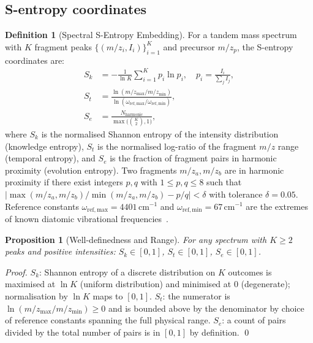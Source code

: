 \documentclass[twocolumn,10pt,a4paper]{article}
\theoremstyle{thmstyle}
\newtheorem{proposition}[theorem]{Proposition}
\theoremstyle{definition}
\newtheorem{definition}[theorem]{Definition}
\theoremstyle{remark}
\newcommand{\Sk}{S_{k}}
\newcommand{\St}{S_{t}}
\newcommand{\Se}{S_{e}}
\begin{document}
\subsection{S-entropy coordinates}

\begin{definition}[Spectral S-Entropy Embedding]
\label{def:sentropy}
For a tandem mass spectrum with $K$ fragment peaks
$\{(m/z_i, I_i)\}_{i=1}^K$ and precursor $m/z_p$, the S-entropy
coordinates are:
\begin{align}
\Sk &= -\frac{1}{\ln K} \sum_{i=1}^{K} p_i \ln p_i,
  \quad p_i = \frac{I_i}{\sum_j I_j},
\label{eq:sk}\\[4pt]
\St &= \frac{\ln(m/z_{\max} / m/z_{\min})}
            {\ln(\omega_{\mathrm{ref,max}}/\omega_{\mathrm{ref,min}})},
\label{eq:st}\\[4pt]
\Se &= \frac{N_{\mathrm{harmonic}}}
            {\max\bigl(\binom{K}{2}, 1\bigr)},
\label{eq:se}
\end{align}
where $\Sk$ is the normalised Shannon entropy of the intensity
distribution (knowledge entropy), $\St$ is the normalised log-ratio
of the fragment $m/z$ range (temporal entropy), and $\Se$ is the
fraction of fragment pairs in harmonic proximity (evolution
entropy). Two fragments $m/z_a, m/z_b$ are in harmonic proximity if
there exist integers $p, q$ with $1 \le p, q \le 8$ such that
$|\max(m/z_a, m/z_b)/\min(m/z_a, m/z_b) - p/q| < \delta$ with
tolerance $\delta = 0.05$. Reference constants
$\omega_{\mathrm{ref,max}} = 4401\,\mathrm{cm}^{-1}$ and
$\omega_{\mathrm{ref,min}} = 67\,\mathrm{cm}^{-1}$ are the extremes
of known diatomic vibrational
frequencies~\citep{sachikonye2024generative}.
\end{definition}

\begin{proposition}[Well-definedness and Range]
\label{prop:sentropy-range}
For any spectrum with $K \ge 2$ peaks and positive intensities:
$\Sk \in [0,1]$, $\St \in [0,1]$, $\Se \in [0,1]$.
\end{proposition}

\begin{proof}
$\Sk$: Shannon entropy of a discrete distribution on $K$ outcomes is
maximised at $\ln K$ (uniform distribution) and minimised at $0$
(degenerate); normalisation by $\ln K$ maps to $[0,1]$. $\St$: the
numerator is $\ln(m/z_{\max}/m/z_{\min}) \ge 0$ and is bounded above
by the denominator by choice of reference constants spanning the full
physical range. $\Se$: a count of pairs divided by the total number
of pairs is in $[0,1]$ by definition. \qed
\end{proof}
\end{document}
